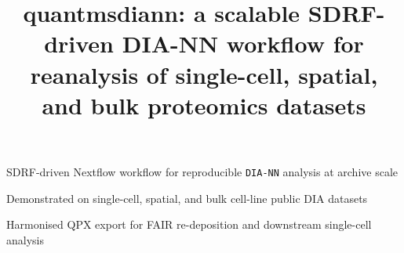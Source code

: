 \documentclass[preprint,12pt]{elsarticle}
\begin{document}
\begin{frontmatter}

\title{quantmsdiann: a scalable SDRF-driven DIA-NN workflow for reanalysis of single-cell, spatial, and bulk proteomics datasets}

\begin{graphicalabstract}
\end{graphicalabstract}

\begin{highlights}
\item SDRF-driven Nextflow workflow for reproducible \texttt{DIA-NN} analysis at archive scale
\item Demonstrated on single-cell, spatial, and bulk cell-line public DIA datasets
\item Harmonised QPX export for FAIR re-deposition and downstream single-cell analysis
\end{highlights}

\end{frontmatter}
\end{document}
